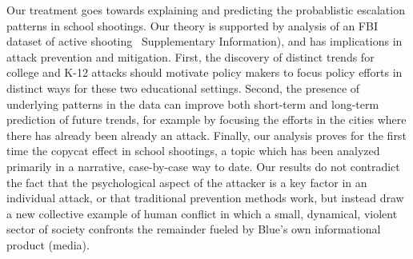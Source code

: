 Our treatment goes towards explaining and
predicting the probablistic
escalation patterns in school shootings. 
Our theory is supported by analysis of an FBI dataset of active
shooting~\cite{FBI}
Supplementary Information), and has implications in attack prevention
and mitigation. 
First, the discovery of distinct trends for college and K-12 attacks
should motivate policy makers to focus policy efforts in distinct ways
for these two educational settings. 
Second, the presence of underlying patterns in the data can improve
both short-term and long-term prediction of future trends, for example
by focusing the efforts in the cities where there has already been
already an attack. 
Finally, our analysis proves for the first time the copycat effect in
school shootings, a topic which has been analyzed primarily in a
narrative, case-by-case way to date. 
Our results do not contradict the fact that the psychological aspect
of the attacker is a key factor in an individual attack, or that
traditional prevention methods work, but instead draw a new collective
example of human conflict in which a small, dynamical, violent sector
of society confronts the remainder fueled by Blue's own informational
product (media). 




